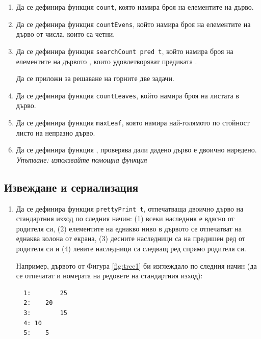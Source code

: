 \begin{enumerate}[]

	\item Да се дефинира функция \texttt{count}, която намира броя на елементите на дърво.

	\item Да се дефинира функция \texttt{countEvens}, който намира броя на елементите на дърво от числа, които са четни.

	\item Да се дефинира функция \verb#searchCount pred t#, който намира броя на елементите на дървото , които удовлетворяват предиката .

	Да се приложи  за решаване на горните две задачи.

	\item Да се дефинира функция \texttt{countLeaves}, който намира броя на листата в дърво.

	\item Да се дефинира функция \texttt{maxLeaf}, която намира най-голямото по стойност листо на непразно дърво. 

  \item Да се дефинира функция , проверява дали дадено дърво е двоично наредено. \emph{Упътване: използвайте помощна функция}


\end{enumerate}

\subsection {Извеждане и сериализация}
  
\begin{enumerate}[resume]

  \item Да се дефинира функция \texttt{prettyPrint t}, отпечатваща двоично дърво на стандартния изход по следния начин: (1) всеки наследник е вдясно от родителя си, (2) елементите на еднакво ниво в дървото се отпечатват на еднаква колона от екрана, (3) десните наследници са на предишен ред от родителя си и (4) левите наследници са следващ ред спрямо родителя си.

  Например, дървото от Фигура \ref{fig:tree1} би изглеждало по следния начин (да се отпечатат и номерата на редовете на стандартния изход):

  \begin{verbatim}
  1:        25
  2:    20
  3:        15
  4: 10
  5:    5
  \end{verbatim}

\end{enumerate}

